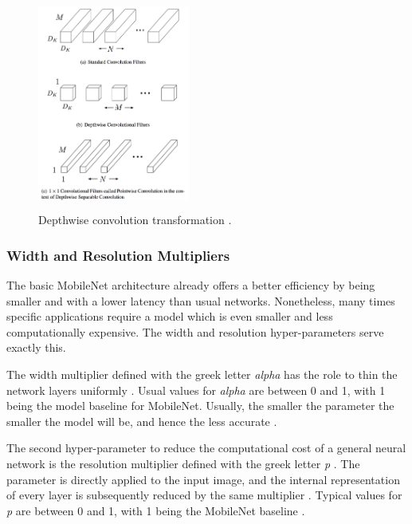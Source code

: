 \begin{figure}[H]
\begin{center}
\includegraphics[width=5cm,height=7cm,keepaspectratio]{images/convolutions.png}
\end{center}
\caption{Depthwise convolution transformation \cite{paper:MobileNets}.}
\end{figure}

\subsubsection{Width and Resolution Multipliers}

The basic MobileNet architecture already offers a better efficiency by being smaller and with a lower latency than usual networks. Nonetheless, many times specific applications require a model which is even smaller and less computationally expensive. The width and resolution hyper-parameters serve exactly this.

The width multiplier defined with the greek letter \textit{alpha} has the role to thin the network layers uniformly \cite{paper:MobileNets}. Usual values for \textit{alpha} are between 0 and 1, with 1 being the model baseline for MobileNet. Usually, the smaller the parameter the smaller the model will be, and hence the less accurate \cite{paper:MobileNets}.

The second hyper-parameter to reduce the computational cost of a general neural network is the resolution multiplier defined with the greek letter \textit{p} \cite{paper:MobileNets}. The parameter is directly applied to the input image, and the internal representation of every layer is subsequently reduced by the same multiplier \cite{paper:MobileNets}. Typical values for \textit{p} are between 0 and 1, with 1 being the MobileNet baseline \cite{paper:MobileNets}.

